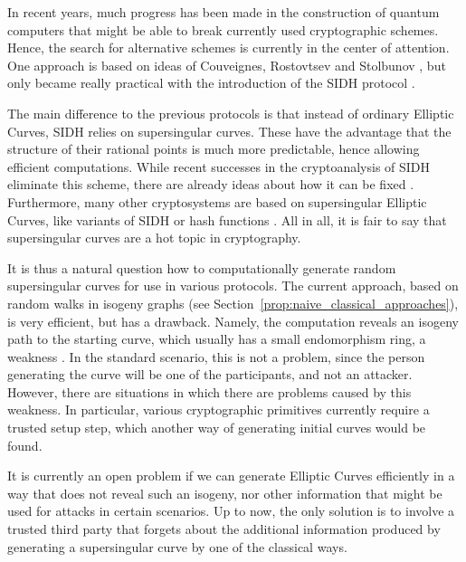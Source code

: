 In recent years, much progress has been made in the construction of quantum computers that might be able to break currently used cryptographic schemes.
Hence, the search for alternative schemes is currently in the center of attention.
One approach is based on ideas of Couveignes, Rostovtsev and Stolbunov \cite{old_isogeny_crypto1, old_isogeny_crypto2, old_isogeny_crypto3}, but only became really practical with the introduction of the SIDH protocol \cite{sidh}.

The main difference to the previous protocols is that instead of ordinary Elliptic Curves, SIDH relies on supersingular curves.
These have the advantage that the structure of their rational points is much more predictable, hence allowing efficient computations.
While recent successes in the cryptoanalysis of SIDH \cite{sidh_broken} eliminate this scheme, there are already ideas about how it can be fixed \cite{sidh_fix1,sidh_fix2}.
Furthermore, many other cryptosystems are based on supersingular Elliptic Curves, like variants of SIDH \cite{csidh, osidh} or hash functions \cite{supersingular_hash_function}.
All in all, it is fair to say that supersingular curves are a hot topic in cryptography.

It is thus a natural question how to computationally generate random supersingular curves for use in various protocols.
The current approach, based on random walks in isogeny graphs (see Section~\ref{prop:naive_classical_approaches}), is very efficient, but has a drawback.
Namely, the computation reveals an isogeny path to the starting curve, which usually has a small endomorphism ring, a weakness \cite{endomorphism_ring_isogeny_path_equivalent}.
In the standard scenario, this is not a problem, since the person generating the curve will be one of the participants, and not an attacker.
However, there are situations in which there are problems caused by this weakness.
In particular, various cryptographic primitives \cite{verifiable_delay_function, torsion_point_problem2} currently require a trusted setup step, which another way of generating initial curves would be found.

It is currently an open problem if we can generate Elliptic Curves efficiently in a way that does not reveal such an isogeny, nor other information that might be used for attacks in certain scenarios.
Up to now, the only solution is to involve a trusted third party that forgets about the additional information produced by generating a supersingular curve by one of the classical ways.

